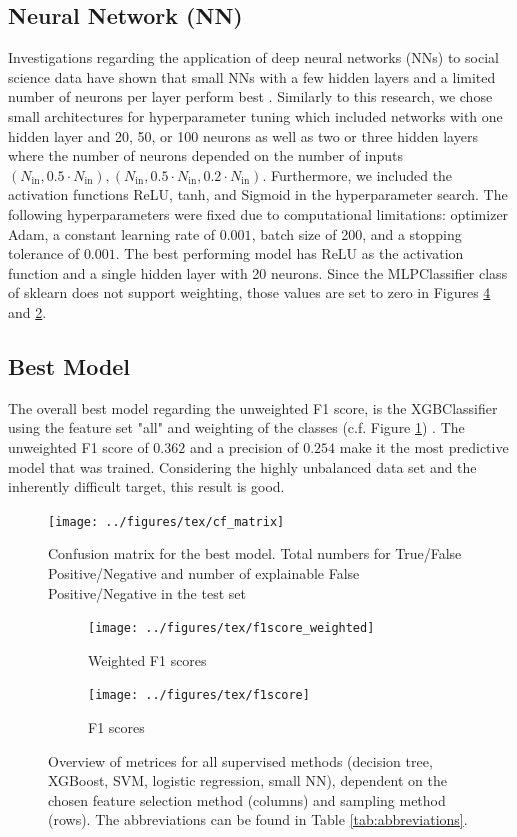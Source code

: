 \documentclass[10pt]{article}
\begin{document}
	\subsection{Neural Network (NN)} %
	Investigations regarding the application of deep neural networks (NNs) to social science data have shown that small NNs with a few hidden layers and a limited number of neurons per layer perform best \cite{serrano:2019}. Similarly to this research, we chose small architectures for hyperparameter tuning which included networks with one hidden layer and 20, 50, or 100 neurons as well as two or three hidden layers where the number of neurons depended on the number of inputs $(N_{\mathrm{in}}, 0.5 \cdot N_{\mathrm{in}} ), (N_{\mathrm{in}}, 0.5 \cdot N_{\mathrm{in}}, 0.2 \cdot N_{\mathrm{in}})$. Furthermore, we included the activation functions ReLU, tanh, and Sigmoid in the hyperparameter search. The following hyperparameters were fixed due to computational limitations: optimizer Adam, a constant learning rate of $0.001$, batch size of 200, and a stopping tolerance of $0.001$. The best performing model has ReLU as the activation function and a single hidden layer with 20 neurons.
	Since the MLPClassifier class of sklearn does not support weighting, those values are set to zero in Figures \ref{fig:f1} and \ref{fig:f1_weighted}.
	
	\subsection{Best Model} %
	The overall best model regarding the unweighted F1 score, is the XGBClassifier using the feature set "all" and weighting of the classes (c.f. Figure \ref{fig:cf_matrix}) .
	The unweighted F1 score of $0.362$ and a precision of $0.254$ make it the most predictive model that was trained. Considering the highly unbalanced data set and the inherently difficult target, this result is good. 
	
	\begin{figure}
		\centering
		\texttt{[image: ../figures/tex/cf\_matrix]}
		\caption{Confusion matrix for the best model. Total numbers for True/False Positive/Negative and number of explainable False Positive/Negative in the test set}
		\label{fig:cf_matrix}
	\end{figure}
	\begin{figure}
		\centering
		\begin{subfigure}[t]{\textwidth}
			\texttt{[image: ../figures/tex/f1score\_weighted]}
			\caption{Weighted F1 scores}
			\label{fig:f1_weighted}
		\end{subfigure}
		\begin{subfigure}[t]{\textwidth}
			\texttt{[image: ../figures/tex/f1score]}
			\caption{F1 scores}
			\label{fig:f1}
		\end{subfigure}
		\caption{Overview of metrices for all supervised methods (decision tree, XGBoost, SVM, logistic regression, small NN), dependent on the chosen feature selection method (columns) and sampling method (rows). The abbreviations can be found in Table \ref{tab:abbreviations}.}
	\end{figure}
	
\end{document}
